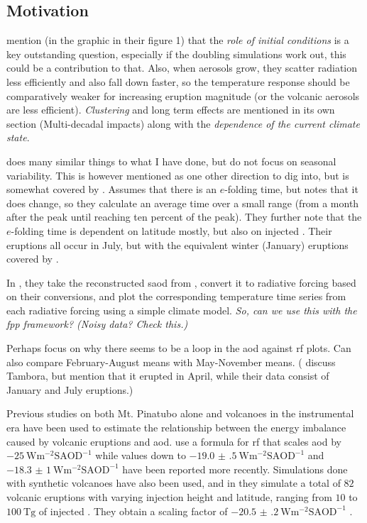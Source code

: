 \documentclass[twocol]{ametsocV5}
\newcommand{\iso}[1][i]{{#1}njected \ce{SO2}}
\begin{document}
\subsection{Motivation}

\citet{marshall2022} mention (in the graphic in their figure 1) that the \emph{role of
  initial conditions} is a key outstanding question, especially if the 
doubling simulations work out, this could be a contribution to that.
Also, when aerosols grow, they scatter radiation less efficiently and also fall down
faster, so the temperature response should be comparatively weaker for increasing
eruption magnitude (or the volcanic aerosols are less efficient). \emph{Clustering} and
long term effects are mentioned in its own section (Multi-decadal impacts) along with
the \emph{dependence of the current climate state}.

\citet{marshall2019} does many similar things to what I have done, but do not focus on
seasonal variability. This is however mentioned as one other direction to dig into, but
is somewhat covered by \citet{marshall2020}. Assumes that there is an $e$-folding time,
but notes that it does change, so they calculate an average time over a small range
(from a month after the peak until reaching ten percent of the peak). They further note
that the $e$-folding time is dependent on latitude mostly, but also on injected
. Their eruptions all occur in July, but with the equivalent winter (January)
eruptions covered by \citet{marshall2020}.

In \citet{marshall2020}, they take the reconstructed \acrshort{saod} from
\citet{toohey2017}, convert it to radiative forcing based on their conversions, and plot
the corresponding temperature time series from each radiative forcing using a simple
climate model. \emph{So, can we use this with the \acrfull{fpp} framework? (Noisy data?
  Check this.)}

Perhaps focus on why there seems to be a loop in the \acrshort{aod} against
\acrshort{rf} plots. Can also compare February-August means with May-November means.
(\citet{marshall2021} discuss Tambora, but mention that it erupted in April, while their
data consist of January and July eruptions.)

Previous studies on both Mt. Pinatubo alone \citep{mills2017,hansen2005} and volcanoes
in the instrumental era \citep{gregory2016} have been used to estimate the relationship
between the energy imbalance caused by volcanic eruptions and \acrshort{aod}.
\citet{myhre2013} use a formula for \acrshort{rf} that scales \acrshort{aod} by
\(\SI{-25}{\watt\metre^{-2}\mathrm{SAOD}^{-1}}\) while values down to
\(\SI{-19.0(5)}{\watt\metre^{-2}\mathrm{SAOD}^{-1}}\) \citep{gregory2016} and
\(\SI{-18.3(10)}{\watt\metre^{-2}\mathrm{SAOD}^{-1}}\) \citep{mills2017} have been
reported more recently. Simulations done with synthetic volcanoes have also been used,
and in \citet{marshall2020} they simulate a total of \(82\) volcanic eruptions with
varying injection height and latitude, ranging from \(10\) to \(\SI{100}{\tera\gram}\)
of \iso{}. They obtain a scaling factor of
\(\SI{-20.5(2)}{\watt\metre^{-2}\mathrm{SAOD}^{-1}}\) \citep{marshall2020}.
\end{document}
